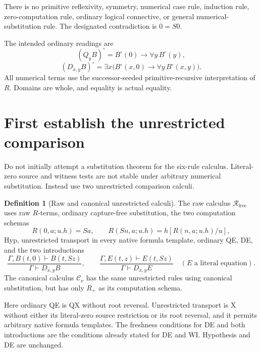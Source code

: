 \documentclass[11pt]{article}
\theoremstyle{definition}\newtheorem{definition}[theorem]{Definition}
\newcommand{\Rfree}{\mathcal R_{\mathrm{free}}}
\newcommand{\Cnorm}{\mathcal C_\nu}
\begin{document}
There is no primitive reflexivity, symmetry, numerical case rule, induction rule, zero-computation rule, ordinary logical connective, or general numerical-substitution rule. The designated contradiction is \(0=S0\).

The intended ordinary readings are
\[
(Q_yB)^\circ=B^\circ(0)\to\forall y\,B^\circ(y),
\]
\[
(D_{x,y}B)^\circ=
\exists x\bigl(B^\circ(x,0)\to\forall y\,B^\circ(x,y)\bigr).
\]
All numerical terms use the successor-seeded primitive-recursive interpretation of \(R\). Domains are whole, and equality is actual equality.

\section{First establish the unrestricted comparison}

Do not initially attempt a substitution theorem for the six-rule calculus. Literal-zero source and witness tests are not stable under arbitrary numerical substitution. Instead use two unrestricted comparison calculi.

\begin{definition}[Raw and canonical unrestricted calculi]
The raw calculus \(\Rfree\) uses raw \(R\)-terms, ordinary capture-free substitution, the two computation schemas
\[
R(0,a;u.h)=Sa,\qquad
R(Sn,a;u.h)=h[R(n,a;u.h)/u],
\]
Hyp, unrestricted transport in every native formula template, ordinary QE, DE, and the two introductions
\[
\frac{\Gamma,B(t,0)\vdash B(t,Sz)}
     {\Gamma\vdash D_{x,y}B},
\qquad
\frac{\Gamma,E(t,z)\vdash E(t,Sz)}
     {\Gamma\vdash D_{x,y}E}
\quad(E\text{ a literal equation}).
\]
The canonical calculus \(\Cnorm\) has the same unrestricted rules using canonical substitution, but has only \(R_+\) as its computation schema.

Here ordinary QE is QX without root reversal. Unrestricted transport is X without either its literal-zero source restriction or its root reversal, and it permits arbitrary native formula templates. The freshness conditions for DE and both introductions are the conditions already stated for DE and WI. Hypothesis and DE are unchanged.
\end{definition}
\end{document}
